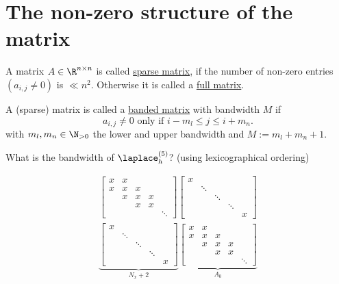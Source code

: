 \chapter{The non-zero structure of the matrix}%
\label{cha:The non-zero structure of the matrix}


A matrix $A \in \R^{n \times n}$ is called \underline{sparse matrix}, if the number of non-zero entries $(a_{i,j}\neq 0)$ is $\ll n^2$. Otherwise it is called a \underline{full matrix}. 

\begin{definition}
\label{thm:sparsetypes}
A (sparse) matrix is called a \underline{banded matrix}  with bandwidth $M$ if
\[
a_{i,j}\neq 0 \text{ only if } i-m_{l} \leq j \leq i + m_{n}
.\] 
with $m_{l},m_{n} \in \N_{>0}$ the lower and upper bandwidth and $M:=m_{l} + m_{n} + 1$.
\end{definition}

What is the bandwidth of $\laplace_{h}^{(5)}$? (using lexicographical ordering)

\begin{align*}
\begin{bmatrix}
	x & x &   &   & \\
	x & x & x &   & \\
	  & x & x & x & \\
	  &   & x & x & \\
	  &   &   &   & \ddots
\end{bmatrix}
\begin{bmatrix}
	x &   &   &   & \\
	  & \ddots &   &   & \\
	  &   & \ddots &   & \\
	  &   &   & \ddots & \\
	  &   &   &   & x
\end{bmatrix} \\
\underbrace{ 
\begin{bmatrix}
	x &   &   &   & \\
	  & \ddots &   &   & \\
	  &   & \ddots &   & \\
	  &   &   & \ddots & \\
	  &   &   &   & x
\end{bmatrix}}_{N_{x}+2}
\underbrace{ 
\begin{bmatrix}
	x & x &   &   & \\
	x & x & x &   & \\
	  & x & x & x & \\
	  &   & x & x & \\
	  &   &   &   & \ddots
\end{bmatrix}}_{A_0}
\end{align*}

